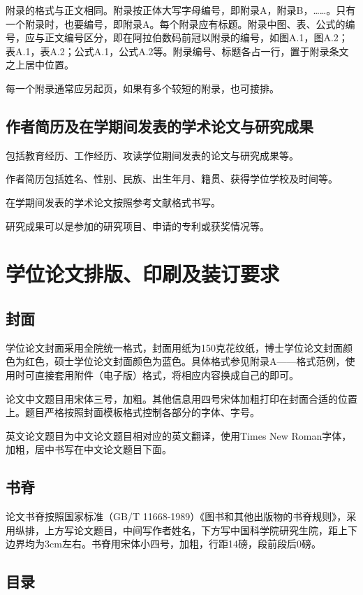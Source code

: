 \documentclass[a4paper,12pt,oneside,openany]{book}
\begin{document}
附录的格式与正文相同。附录按正体大写字母编号，即附录A，附录B，……。只有一个附录时，也要编号，即附录A。每个附录应有标题。附录中图、表、公式的编号，应与正文编号区分，即在阿拉伯数码前冠以附录的编号，如图A.1，图A.2；表A.1，表A.2；公式A.1，公式A.2等。附录编号、标题各占一行，置于附录条文之上居中位置。

每一个附录通常应另起页，如果有多个较短的附录，也可接排。 


\subsection{作者简历及在学期间发表的学术论文与研究成果}

包括教育经历、工作经历、攻读学位期间发表的论文与研究成果等。

作者简历包括姓名、性别、民族、出生年月、籍贯、获得学位学校及时间等。

在学期间发表的学术论文按照参考文献格式书写。

研究成果可以是参加的研究项目、申请的专利或获奖情况等。 


\section{学位论文排版、印刷及装订要求}


\subsection{封面}

学位论文封面采用全院统一格式，封面用纸为150克花纹纸，博士学位论文封面颜色为红色，硕士学位论文封面颜色为蓝色。具体格式参见附录A——格式范例，使用时可直接套用附件（电子版）格式，将相应内容换成自己的即可。

论文中文题目用宋体三号，加粗。其他信息用四号宋体加粗打印在封面合适的位置上。题目严格按照封面模板格式控制各部分的字体、字号。

英文论文题目为中文论文题目相对应的英文翻译，使用Times New Roman字体，加粗，居中书写在中文论文题目下面。 


\subsection{书脊}

论文书脊按照国家标准（GB/T 11668-1989）《图书和其他出版物的书脊规则》，采用纵排，上方写论文题目，中间写作者姓名，下方写中国科学院研究生院，距上下边界均为3cm左右。书脊用宋体小四号，加粗，行距14磅，段前段后0磅。


\subsection{目录}
\end{document}
